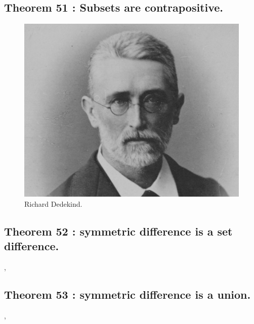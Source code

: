 \documentclass[preview]{standalone}
\begin{document}
\subsection[Subsets are contrapositive.]
    {
        \color{section}Theorem 51 \color{black} : Subsets are contrapositive.
    }

\vspace{2.5\baselineskip}
\begin{figure}[!h]
    \centering
    \includegraphics[width=13cm]{../resources/jpg/2.2.set.operations/dedekind.png}
    \caption*{Richard Dedekind.}
\end{figure}
\pagebreak


\subsection[Symmetric difference is a set difference.]
    {
        \color{section}Theorem 52 \color{black} : symmetric difference is a set difference.
    }

\sep
\pagebreak


\subsection[Symmetric difference is a union.]
    {
        \color{section}Theorem 53 \color{black} : symmetric difference is a union.
    }

\sep
\end{document}
